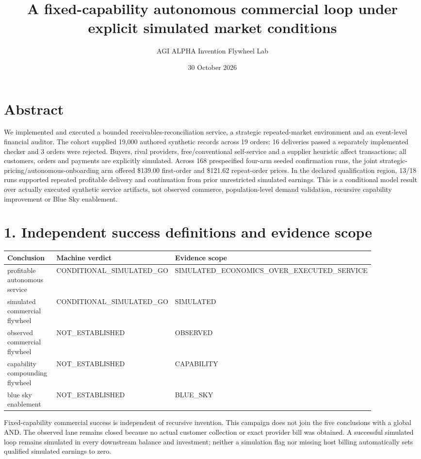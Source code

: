 \documentclass[10pt,letterpaper]{article}
\title{A fixed-capability autonomous commercial loop under explicit simulated market conditions}
\author{AGI ALPHA Invention Flywheel Lab}
\date{30 October 2026}
\begin{document}
\maketitle
{}
\section*{Abstract}
We implemented and executed a bounded receivables-reconciliation service, a strategic repeated-market environment and an event-level financial auditor. The cohort supplied 19,000 authored synthetic records across 19 orders: 16 deliveries passed a separately implemented checker and 3 orders were rejected. Buyers, rival providers, free/conventional self-service and a supplier heuristic affect transactions; all customers, orders and payments are explicitly simulated. Across 168 prespecified four-arm seeded confirmation runs, the joint strategic-pricing/autonomous-onboarding arm offered \$139.00 first-order and \$121.62 repeat-order prices. In the declared qualification region, 13/18 runs supported repeated profitable delivery and continuation from prior unrestricted simulated earnings. This is a conditional model result over actually executed synthetic service artifacts, not observed commerce, population-level demand validation, recursive capability improvement or Blue Sky enablement.

\section*{1. Independent success definitions and evidence scope}
\begin{longtable}{>{\raggedright\arraybackslash}p{0.280\linewidth}>{\raggedright\arraybackslash}p{0.300\linewidth}>{\raggedright\arraybackslash}p{0.300\linewidth}}
\toprule
\textbf{Conclusion} & \textbf{Machine verdict} & \textbf{Evidence scope}\\
\midrule
\endhead
profitable autonomous service & CONDITIONAL\_\allowbreak{}SIMULATED\_\allowbreak{}GO & SIMULATED\_\allowbreak{}ECONOMICS\_\allowbreak{}OVER\_\allowbreak{}EXECUTED\_\allowbreak{}SERVICE\\
simulated commercial flywheel & CONDITIONAL\_\allowbreak{}SIMULATED\_\allowbreak{}GO & SIMULATED\\
observed commercial flywheel & NOT\_\allowbreak{}ESTABLISHED & OBSERVED\\
capability compounding flywheel & NOT\_\allowbreak{}ESTABLISHED & CAPABILITY\\
blue sky enablement & NOT\_\allowbreak{}ESTABLISHED & BLUE\_\allowbreak{}SKY\\
\bottomrule
\end{longtable}
Fixed-capability commercial success is independent of recursive invention. This campaign does not join the five conclusions with a global AND. The observed lane remains closed because no actual customer collection or exact provider bill was obtained. A successful simulated loop remains simulated in every downstream balance and investment; neither a simulation flag nor missing host billing automatically sets qualified simulated earnings to zero.
\end{document}
